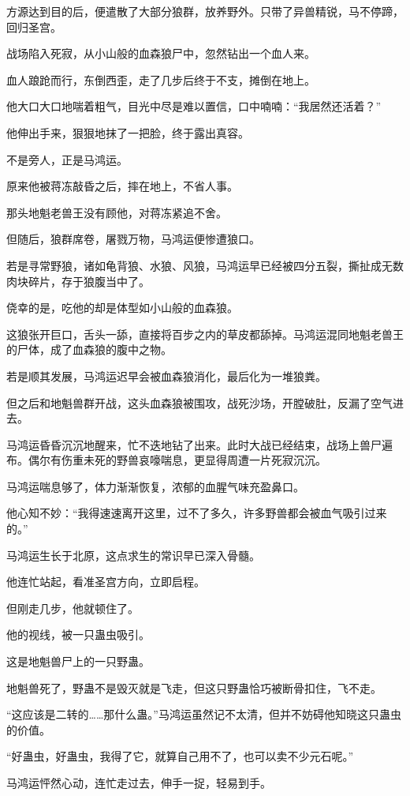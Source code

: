 \begin{this_body}
方源达到目的后，便遣散了大部分狼群，放养野外。只带了异兽精锐，马不停蹄，回归圣宫。

战场陷入死寂，从小山般的血森狼尸中，忽然钻出一个血人来。

血人踉跄而行，东倒西歪，走了几步后终于不支，摊倒在地上。

他大口大口地喘着粗气，目光中尽是难以置信，口中喃喃：“我居然还活着？”

他伸出手来，狠狠地抹了一把脸，终于露出真容。

不是旁人，正是马鸿运。

原来他被蒋冻敲昏之后，摔在地上，不省人事。

那头地魁老兽王没有顾他，对蒋冻紧追不舍。

但随后，狼群席卷，屠戮万物，马鸿运便惨遭狼口。

若是寻常野狼，诸如龟背狼、水狼、风狼，马鸿运早已经被四分五裂，撕扯成无数肉块碎片，存于狼腹当中了。

侥幸的是，吃他的却是体型如小山般的血森狼。

这狼张开巨口，舌头一舔，直接将百步之内的草皮都舔掉。马鸿运混同地魁老兽王的尸体，成了血森狼的腹中之物。

若是顺其发展，马鸿运迟早会被血森狼消化，最后化为一堆狼粪。

但之后和地魁兽群开战，这头血森狼被围攻，战死沙场，开膛破肚，反漏了空气进去。

马鸿运昏昏沉沉地醒来，忙不迭地钻了出来。此时大战已经结束，战场上兽尸遍布。偶尔有伤重未死的野兽哀嚎喘息，更显得周遭一片死寂沉沉。

马鸿运喘息够了，体力渐渐恢复，浓郁的血腥气味充盈鼻口。

他心知不妙：“我得速速离开这里，过不了多久，许多野兽都会被血气吸引过来的。”

马鸿运生长于北原，这点求生的常识早已深入骨髓。

他连忙站起，看准圣宫方向，立即启程。

但刚走几步，他就顿住了。

他的视线，被一只蛊虫吸引。

这是地魁兽尸上的一只野蛊。

地魁兽死了，野蛊不是毁灭就是飞走，但这只野蛊恰巧被断骨扣住，飞不走。

“这应该是二转的……那什么蛊。”马鸿运虽然记不太清，但并不妨碍他知晓这只蛊虫的价值。

“好蛊虫，好蛊虫，我得了它，就算自己用不了，也可以卖不少元石呢。”

马鸿运怦然心动，连忙走过去，伸手一捉，轻易到手。

\end{this_body}

